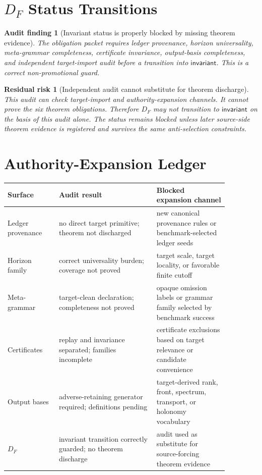 \documentclass[11pt]{article}
\newtheorem{auditfinding}{Audit finding}
\newtheorem{risk}{Residual risk}
\begin{document}
\section{\texorpdfstring{\(D_F\)}{DF} Status Transitions}

\begin{auditfinding}[Invariant status is properly blocked by missing theorem evidence]
The obligation packet requires ledger provenance, horizon universality,
meta-grammar completeness, certificate invariance, output-basis completeness,
and independent target-import audit before a transition into
\(\mathsf{invariant}\). This is a correct non-promotional guard.
\end{auditfinding}

\begin{risk}[Independent audit cannot substitute for theorem discharge]
This audit can check target-import and authority-expansion channels. It cannot
prove the six theorem obligations. Therefore \(D_F\) may not transition to
\(\mathsf{invariant}\) on the basis of this audit alone. The status remains
blocked unless later source-side theorem evidence is registered and survives
the same anti-selection constraints.
\end{risk}

\section{Authority-Expansion Ledger}

\begin{center}
\begin{tabular}{p{0.2\linewidth}p{0.38\linewidth}p{0.29\linewidth}}
\textbf{Surface} & \textbf{Audit result} & \textbf{Blocked expansion channel} \\
\hline
Ledger provenance & no direct target primitive; theorem not discharged &
new canonical provenance rules or benchmark-selected ledger seeds \\
Horizon family & correct universality burden; coverage not proved &
target scale, target locality, or favorable finite cutoff \\
Meta-grammar & target-clean declaration; completeness not proved &
opaque omission labels or grammar family selected by benchmark success \\
Certificates & replay and invariance separated; families incomplete &
certificate exclusions based on target relevance or candidate convenience \\
Output bases & adverse-retaining generator required; definitions pending &
target-derived rank, front, spectrum, transport, or holonomy vocabulary \\
\(D_F\) & invariant transition correctly guarded; no theorem discharge &
audit used as substitute for source-forcing theorem evidence \\
\end{tabular}
\end{center}
\end{document}
